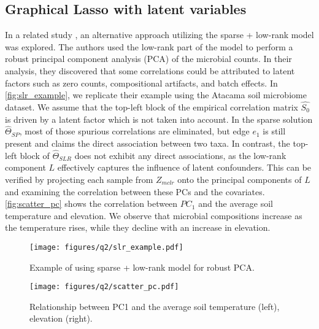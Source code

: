 \documentclass[10pt,a4paper]{article}
\let\cite\citep
\begin{document}
\subsection*{Graphical Lasso with latent variables}
\par In a related study \cite{kurtz2019disentangling}, an alternative approach utilizing the sparse + low-rank model was explored. The authors used the low-rank part of the model to perform a robust principal component analysis (PCA) \cite{candes2011robust} of the microbial counts. In their analysis, they discovered that some correlations could be attributed to latent factors such as zero counts, compositional artifacts, and batch effects. In \autoref{fig:slr_example}, we replicate their example using the Atacama soil microbiome dataset. We assume that the top-left block of the empirical correlation matrix $\hat{S_{0}}$ is driven by a latent factor which is not taken into account. In the sparse solution $\hat\Theta_{SP}$, most of those spurious correlations are eliminated, but edge $e_{1}$ is still present and claims the direct association between two taxa. In contrast, the top-left block of $\hat\Theta_{SLR}$ does not exhibit any direct associations, as the low-rank component $L$ effectively captures the influence of latent confounders. This can be verified by projecting each sample from $Z_{mclr}$ onto the principal components of $L$ and examining the correlation between these PCs and the covariates. \autoref{fig:scatter_pc} shows the correlation between $PC_{1}$ and the average soil temperature and elevation. We observe that microbial compositions increase as the temperature rises, while they decline with an increase in elevation.

\begin{figure}[h]
    \centering
    \texttt{[image: figures/q2/slr\_example.pdf]}
    \caption{Example of using sparse + low-rank model for robust PCA.}
    \label{fig:slr_example}
\end{figure}

\begin{figure}[h]
    \centering
    \texttt{[image: figures/q2/scatter\_pc.pdf]}
    \caption{Relationship between PC1 and the average soil temperature (left), elevation (right).}
    \label{fig:scatter_pc}
\end{figure}

\end{document}
